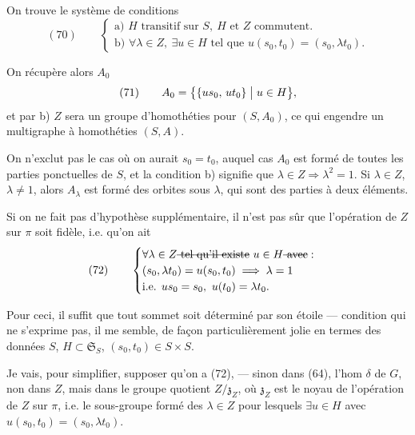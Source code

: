 \documentclass[11pt,a4paper]{article}
\begin{document}
On trouve le système de conditions
\[
(70)\qquad
\begin{cases}
\text{a) } H \text{ transitif sur } S,\ H \text{ et } Z \text{ commutent.}\\
\text{b) } \forall \lambda\in Z,\ \exists u\in H \text{ tel que } u(s_0,t_0) = (s_0, \lambda t_0) .
\end{cases}
\]

On récupère alors $A_0$
\[
(71)\qquad A_0 = \bigl\{\{us_0,\, ut_0\} \bigm| u\in H\bigr\} ,
\]
et par b) $Z$ sera un groupe d'homothéties pour
$(S, A_0)$, ce qui engendre un multigraphe à homothéties $(S,A)$.

On n'exclut pas le cas où on aurait $s_0=t_0$, auquel cas $A_0$ est formé de toutes les
parties ponctuelles de $S$, et la condition b) signifie que $\lambda\in Z \Rightarrow \lambda^2=1$. Si $\lambda\in Z$, $\lambda\neq 1$, alors $A_\lambda$ est formé des orbites sous
$\lambda$, qui sont des parties à deux éléments. 

Si on ne fait pas d'hypothèse supplémentaire, il n'est pas sûr que l'opération de $Z$ sur
$\pi$ soit fidèle, i.e. qu'on ait
\[
(72)\qquad
\begin{cases}
\forall \lambda\in Z \text{\struck{ tel qu'il existe}}\ u\in H \text{\struck{ avec}} :\\
(s_0, \lambda t_0) = u(s_0,t_0) \;\Longrightarrow\; \lambda = 1 \\
\text{i.e. } us_0 = s_0,\ u(t_0) = \lambda t_0 .
\end{cases}
\]

Pour ceci, il suffit que tout sommet soit déterminé par son étoile — condition qui ne
s'exprime pas, il me semble, de façon
particulièrement jolie en termes des données
$S$, $H\subset\mathfrak{S}_S$, $(s_0,t_0)\in S\times S$.

Je vais, pour simplifier, supposer qu'on a (72),
— sinon dans (64), l'hom $\delta$  de \struck{\ill{}} $G$, non dans $Z$, mais dans le groupe quotient
$Z/\mathfrak{z}_Z$, où $\mathfrak{z}_Z$ est le noyau de l'opération de $Z$ sur $\pi$, i.e. le
sous-groupe formé des $\lambda\in Z$ pour lesquels $\exists u\in H$ avec $u(s_0,t_0) = (s_0, \lambda t_0)$.
\end{document}
